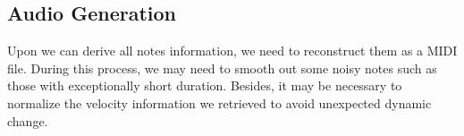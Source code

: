 \documentclass[10pt,twocolumn,letterpaper]{article}
\begin{document}
\subsection{Audio Generation}

Upon we can derive all notes information, we need to reconstruct them as a MIDI file. During this process, we may need to smooth out some noisy notes such as those with exceptionally short duration. Besides, it may be necessary to normalize the velocity information we retrieved to avoid unexpected dynamic change.

{\small


}
\end{document}
